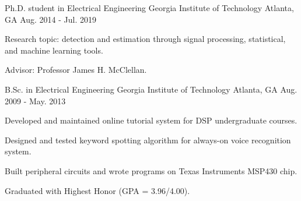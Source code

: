 

\begin{cventries}

  \cventry
    {Ph.D. student in Electrical Engineering} %
    {Georgia Institute of Technology} %
    {Atlanta, GA} %
    {Aug. 2014 - Jul. 2019} %
    {
      \begin{cvitems} %
        \item {Research topic: detection and estimation through signal processing, statistical, and machine learning tools.}
        \item {Advisor: Professor James H. McClellan.}
      \end{cvitems}
    }
    
  \cventry
    {B.Sc. in Electrical Engineering} %
    {Georgia Institute of Technology} %
    {Atlanta, GA} %
    {Aug. 2009 - May. 2013} %
    {
      \begin{cvitems} %
        \item {Developed and maintained online tutorial system for DSP undergraduate courses.}
        \item {Designed and tested keyword spotting algorithm for always-on voice recognition system.}
        \item {Built peripheral circuits and wrote programs on Texas Instruments MSP430 chip.}
        \item {Graduated with Highest Honor (GPA = 3.96/4.00).}
      \end{cvitems}
    }

\end{cventries}
